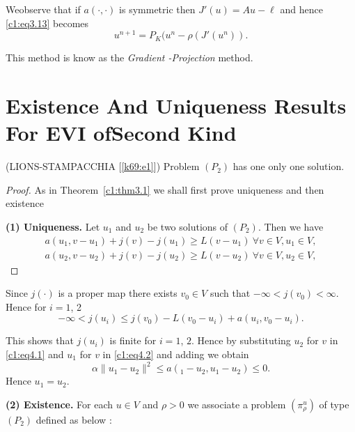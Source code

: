 We\pageoriginale observe that if $a(\cdot , \cdot)$ is symmetric then
$J'(u) = Au - \ell$ 
and hence \eqref{c1:eq3.13} becomes  
\begin{equation}
u^{n+1} = P_K(u^n - \rho(J'(u^n)). \tag{3.13'}\label{c1:eq3.13'}
\end{equation}

This method is know as the \textit{Gradient -Projection} method.

\section[Existence And Uniqueness Results...]{Existence And Uniqueness Results 
For EVI of\hfil\break Second Kind}\label{c1:s4}%

\begin{theorem}\label{c1:thm4.1}%
(LIONS-STAMPACCHIA [\ref{k69:e1}]) Problem $(P_2)$ has one only one
  solution. 
\end{theorem}

\begin{proof}
As in Theorem~\ref{c1:thm3.1} we shall first prove uniqueness and then
existence  

\textbf{(1) Uniqueness.} Let $u_1$ and $u_2$ be two solutions of $(P_2)$. Then we have 
\begin{align}
a(u_1, v - u_1) + j(v) - j(u_1) \geq L(v - u_1) ~\forall v \in
V, u_1 \in V, \tag{4.1}\label{c1:eq4.1}\\ 
a(u_2, v - u_2) + j(v) - j(u_2) \geq L(v - u_2) ~\forall v \in
V, u_2 \in V, \tag{4.2}\label{c1:eq4.2} 
\end{align}
\end{proof}

Since $j( \cdot)$ is a proper map there exists $v_0 \in V$ such
that $-\infty < j(v_0) < \infty$. Hence for $i = 1$, 2 
\begin{equation}
-\infty < j(u_i) \leq j(v_0) - L(v_0 - u_i) + a (u_i, v_0 -
u_i). \tag{4.3}\label{c1:eq4.3} 
\end{equation}

This shows that $j(u_i)$ is finite for $i=1$, $2$. Hence by
substituting $u_2$ for $v$ in \eqref{c1:eq4.1} and $u_1$ for $v$ in \eqref{c1:eq4.2} and
adding we obtain  
\begin{equation}
\alpha \parallel u_1 - u_2 \parallel^2  \leq a (_1 - u_2, u_1 - u_2)
\leq 0. \tag{4.4}\label{c1:eq4.4} 
\end{equation}
Hence $u_1 = u_2$. 

\textbf{(2) Existence.} For each $u \in V$ and $\rho > 0$ we
associate a problem $(\pi^u_\rho)$ of type $(P_2)$ defined as below : 

